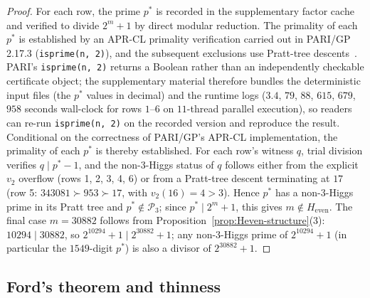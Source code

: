 \documentclass[11pt]{amsart}
\theoremstyle{plain}
\theoremstyle{definition}
\begin{document}
\begin{proof}
For each row, the prime $p^{*}$ is recorded in the
supplementary factor cache and verified to divide $2^m + 1$ by direct
modular reduction. The primality of each $p^{*}$ is established by an
APR-CL primality verification carried out in PARI/GP 2.17.3
(\texttt{isprime(n, 2)}), and the subsequent exclusions use Pratt-tree
descents~\cite{FKL,WimmerNoschinski}. PARI's \texttt{isprime(n, 2)}
returns a Boolean rather than an independently checkable certificate
object;
the supplementary material therefore bundles the deterministic input
files (the $p^{*}$ values in decimal) and the runtime logs ($3.4$,
$79$, $88$, $615$, $679$, $958$ seconds wall-clock for rows
$1$--$6$ on $11$-thread parallel execution), so readers can re-run
\texttt{isprime(n, 2)} on the recorded version and reproduce the
result. Conditional on the correctness of PARI/GP's APR-CL
implementation, the primality of each $p^{*}$ is thereby established. For each row's witness $q$, trial division
verifies $q \mid p^{*} - 1$, and the non-3-Higgs status of $q$ follows
either from the explicit $v_2$ overflow (rows 1, 2, 3, 4, 6) or from a
Pratt-tree descent terminating at $17$ (row 5: $343081 \succ 953
\succ 17$, with $v_2(16) = 4 > 3$). Hence $p^{*}$ has a non-3-Higgs
prime in its Pratt tree and $p^{*} \notin \mathcal{P}_3$; since
$p^{*} \mid 2^m+1$, this gives $m \notin H_{\mathrm{even}}$. The
final case $m = 30882$ follows from
Proposition~\ref{prop:Heven-structure}(3): $10294 \mid 30882$, so
$2^{10294}+1 \mid 2^{30882}+1$; any non-3-Higgs prime of $2^{10294}+1$
(in particular the $1549$-digit $p^{*}$) is also a divisor of
$2^{30882}+1$.
\end{proof}

\subsection{Ford's theorem and thinness}
\end{document}
